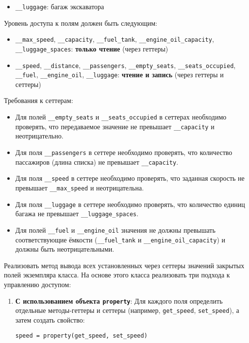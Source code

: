 \begin{enumerate}
\begin{itemize}
    \item \texttt{\_\_luggage}: багаж экскаватора  
\end{itemize}
Уровень доступа к полям должен быть следующим:
\begin{itemize}
    \item \texttt{\_\_max\_speed}, \texttt{\_\_capacity}, \texttt{\_\_fuel\_tank}, \texttt{\_\_engine\_oil\_capacity}, \texttt{\_\_luggage\_spaces}: \textbf{только чтение} (через геттеры)  
    \item \texttt{\_\_speed}, \texttt{\_\_distance}, \texttt{\_\_passengers}, \texttt{\_\_empty\_seats}, \texttt{\_\_seats\_occupied}, \texttt{\_\_fuel}, \texttt{\_\_engine\_oil}, \texttt{\_\_luggage}: \textbf{чтение и запись} (через геттеры и сеттеры)
\end{itemize}
Требования к сеттерам:
\begin{itemize}
    \item Для полей \texttt{\_\_empty\_seats} и \texttt{\_\_seats\_occupied} в сеттерах необходимо проверять, что передаваемое значение не превышает \texttt{\_\_capacity} и неотрицательно.  
    \item Для поля \texttt{\_\_passengers} в сеттере необходимо проверять, что количество пассажиров (длина списка) не превышает \texttt{\_\_capacity}.  
    \item Для поля \texttt{\_\_speed} в сеттере необходимо проверять, что заданная скорость не превышает \texttt{\_\_max\_speed} и неотрицательна.  
    \item Для поля \texttt{\_\_luggage} в сеттере необходимо проверять, что количество единиц багажа не превышает \texttt{\_\_luggage\_spaces}.
    \item Для полей \texttt{\_\_fuel} и \texttt{\_\_engine\_oil} значения не должны превышать соответствующие ёмкости (\texttt{\_\_fuel\_tank} и \texttt{\_\_engine\_oil\_capacity}) и должны быть неотрицательными.
\end{itemize}
Реализовать метод вывода всех установленных через сеттеры значений закрытых полей экземпляра класса.
На основе этого класса реализовать три подхода к управлению доступом:
\begin{enumerate}
    \item \textbf{С использованием объекта \texttt{property}}:  
    Для каждого поля определить отдельные методы-геттеры и сеттеры (например, \texttt{get\_speed}, \texttt{set\_speed}), а затем создать свойство:  
    \begin{verbatim}
speed = property(get_speed, set_speed)
    \end{verbatim}  

\end{enumerate}
\end{enumerate}
